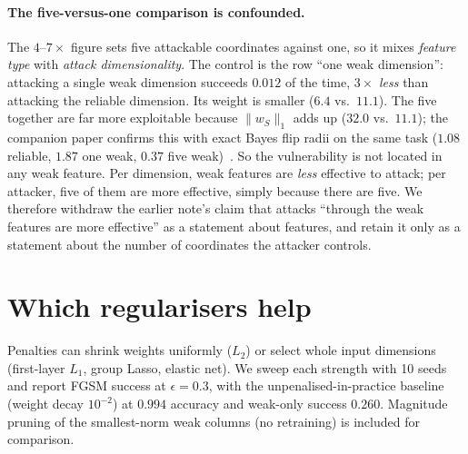 \documentclass[11pt]{article}
\begin{document}
\paragraph{The five-versus-one comparison is confounded.} The $4$--$7\times$ figure sets five
attackable coordinates against one, so it mixes \emph{feature type} with \emph{attack
dimensionality}. The control is the row ``one weak dimension'': attacking a single weak dimension
succeeds $0.012$ of the time, $3\times$ \emph{less} than attacking the reliable dimension. Its weight is
smaller ($6.4$ vs.\ $11.1$). The five together are far more exploitable because $\|w_S\|_1$ adds up
($32.0$ vs.\ $11.1$); the companion paper confirms this with exact Bayes flip radii on the same
task ($1.08$ reliable, $1.87$ one weak, $0.37$ five weak)~\cite{rootcause}. So the vulnerability is
not located in any weak feature. Per dimension, weak features are \emph{less} effective to attack;
per attacker, five of them are more effective, simply because there are five. We therefore withdraw the
earlier note's claim that attacks ``through the weak features are more effective'' as a statement
about features, and retain it only as a statement about the number of coordinates the attacker controls.

\section{Which regularisers help}
\label{sec:reg}

Penalties can shrink weights uniformly (\(L_2\)) or select whole input dimensions (first-layer $L_1$,
group Lasso, elastic net). We sweep each strength with 10 seeds and report FGSM success at
$\epsilon=0.3$, with the unpenalised-in-practice baseline (weight decay $10^{-2}$) at $0.994$
accuracy and weak-only success $0.260$. Magnitude pruning of the smallest-norm weak columns
(no retraining) is included for comparison.
\end{document}
